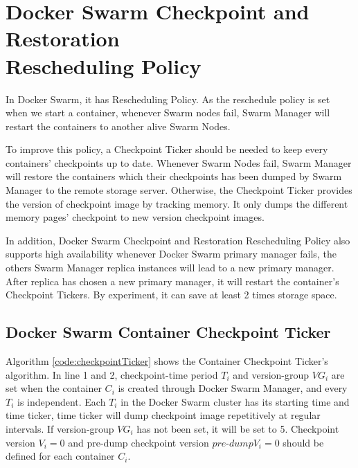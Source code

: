 \section{Docker Swarm Checkpoint and Restoration \\Rescheduling Policy}
\label{sec:checkpoint restore rescheduling policy}
In Docker Swarm, it has Rescheduling Policy. As the reschedule policy is set when we start a container, whenever Swarm nodes fail, Swarm Manager will restart the containers to another alive Swarm Nodes.

To improve this policy, a Checkpoint Ticker should be needed to keep every containers' checkpoints up to date.
Whenever Swarm Nodes fail, Swarm Manager will restore the containers which their checkpoints has been dumped by Swarm Manager to the remote storage server.
Otherwise, the Checkpoint Ticker provides the version of checkpoint image by tracking memory. It only dumps the different memory pages' checkpoint to new version checkpoint images.

In addition, Docker Swarm Checkpoint and Restoration Rescheduling Policy also supports high availability whenever Docker Swarm primary manager fails, the others Swarm Manager replica instances will lead to a new primary manager. After replica has chosen a new primary manager, it will restart the container's Checkpoint Tickers.
By experiment, it can save at least 2 times storage space.

\subsection{Docker Swarm Container Checkpoint Ticker}
Algorithm \ref{code:checkpointTicker} shows the Container Checkpoint Ticker's algorithm.
In line 1 and 2, checkpoint-time period $T_i$ and version-group $VG_i$ are set when the container $C_i$ is created through Docker Swarm Manager, and every $T_i$ is independent.
Each $T_i$ in the Docker Swarm cluster has its starting time and time ticker, time ticker will dump checkpoint image repetitively at regular intervals. If version-group $VG_i$ has not been set, it will be set to 5.
Checkpoint version $V_i=0$ and pre-dump checkpoint version $pre$-$dump V_i=0$ should be defined for each container $C_i$.

